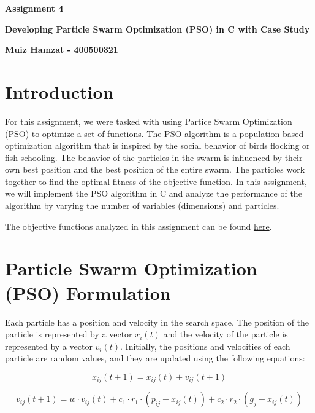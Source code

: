 \documentclass[12pt]{article}
\begin{document}
	
	\justifying
	
	\begin{center}
		\textbf{{\large Assignment 4}}
		
		\textbf{Developing Particle Swarm Optimization (PSO) in C with Case Study} 
		
		\textbf{Muiz Hamzat - 400500321}
		
	\end{center}
	

	
	
	
	\section{Introduction}
	
	For this assignment, we were tasked with using Partice Swarm Optimization (PSO) to optimize a set of functions. The PSO algorithm is a population-based optimization algorithm that is inspired by the social behavior of birds flocking or fish schooling. The behavior of the particles in the swarm is influenced by their own best position and the best position of the entire swarm. The particles work together to find the optimal fitness of the objective function. In this assignment, we will implement the PSO algorithm in C and analyze the performance of the algorithm by varying the number of variables (dimensions) and particles.

	The objective functions analyzed in this assignment can be found \href{https://www.sfu.ca/~ssurjano/optimization.html}{here}.
	
	

	
	
	\section{Particle Swarm Optimization (PSO) Formulation}
	
	
	Each particle has a position and velocity in the search space. The position of the particle is represented by a vector \(x_i(t)\) and the velocity of the particle is represented by a vector \(v_i(t)\). Initially, the positions and velocities of each particle are random values, and they are updated using the following equations:
	
	\[
	x_{ij}(t+1) = x_{ij}(t) + v_{ij}(t+1)
	\]

	\[
	v_{ij}(t+1) = w \cdot v_{ij}(t) + c_1 \cdot r_1 \cdot (p_{ij} - x_{ij}(t)) + c_2 \cdot r_2 \cdot (g_j - x_{ij}(t))
	\]
\end{document}
